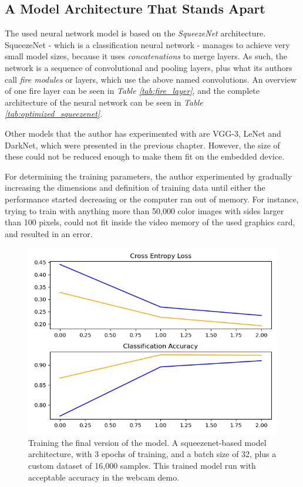 \subsection{A Model Architecture That Stands Apart}
The used neural network model is based on the \textit{SqueezeNet} architecture. SqueezeNet - which is a classification neural network - manages to achieve very small model sizes, because it uses \textit{concatenations} to merge layers. As such, the network is a sequence of convolutional and pooling layers, plus what its authors call \textit{fire modules} or layers, which use the above named convolutions. An overview of one fire layer can be seen in \textit{Table \ref{tab:fire_layer}}, and the complete architecture of the neural network can be seen in \textit{Table \ref{tab:optimized_squeezenet}}. \par

Other models that the author has experimented with are VGG-3, LeNet and DarkNet, which were presented in the previous chapter. However, the size of these could not be reduced enough to make them fit on the embedded device. \par 
For determining the training parameters, the author experimented by gradually increasing the dimensions and definition of training data until either the performance started decreasing or the computer ran out of memory. For instance, trying to train with anything more than 50,000 color images with sides larger than 100 pixels, could not fit inside the video memory of the used graphics card, and resulted in an error.
\begin{figure}
    \centering
    \includegraphics[height = 10 cm]{images/squeezenet_3epochs.png}
    \caption{Training the final version of the model. A squeezenet-based model architecture, with 3 epochs of training, and a batch size of 32, plus a custom dataset of 16,000 samples. This trained model run with acceptable accuracy in the webcam demo.}
    \label{fig:squeezenet_final_3_epochs}
\end{figure}
